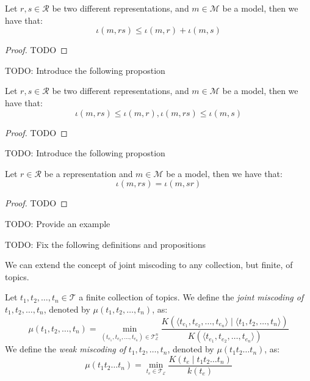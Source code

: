 \begin{proposition}
Let $r, s \in \mathcal{R}$ be two different representations, and $m \in \mathcal{M}$ be a model, then we have that:
\[
\iota(m, rs) \leq \iota(m, r) + \iota(m, s)
\]
\end{proposition}
\begin{proof}
{\color{red} TODO}
\end{proof}

{\color{red} TODO: Introduce the following propostion}

\begin{proposition}
Let $r, s \in \mathcal{R}$ be two different representations, and $m \in \mathcal{M}$ be a model, then we have that:
\[
\iota(m, rs) \leq \iota(m, r), \iota(m, rs) \leq \iota(m, s)
\]
\end{proposition}
\begin{proof}
{\color{red} TODO}
\end{proof}


{\color{red} TODO: Introduce the following propostion}

\begin{proposition}
Let $r \in \mathcal{R}$ be a representation and $m \in \mathcal{M}$ be a model, then we have that:
\[
\iota(m, rs) = \iota(m, sr)
\]
\end{proposition}
\begin{proof}
{\color{red} TODO}
\end{proof}

\begin{example}
\label{ex:inaccuracy_joint_inequality}
{\color{red} TODO: Provide an example}
\end{example}

{\color{red} TODO: Fix the following definitions and propositions}

We can extend the concept of joint miscoding to any collection, but finite, of topics.

\begin{definition}
Let $t_1, t_2, \ldots, t_n \in \mathcal{T}$ a finite collection of topics. We define the \emph{joint miscoding of} $t_1, t_2, \ldots, t_n$, denoted by $\mu(t_1, t_2, \ldots, t_n)$, as:
\[
\mu(t_1, t_2, \ldots, t_n) = \min_{(t_{e_1}, t_{e_2}, \ldots, t_{e_n}) \in \mathcal{T}_\mathcal{E}^n}  \frac{K \left( \langle t_{e_1}, t_{e_2}, \ldots, t_{e_n} \rangle \mid \langle t_1, t_2, \ldots, t_n \rangle \right) }{K \left( \langle t_{e_1}, t_{e_2}, \ldots, t_{e_n} \rangle \right)}
\]
We define the \emph{weak miscoding of} $t_1, t_2, \ldots, t_n$, denoted by $\mu(t_1 t_2 \ldots t_n)$, as:
\[
\mu(t_1 t_2 \ldots t_n) = \min_{t_e \in \mathcal{T}_\mathcal{E}} \frac{K(t_e \mid t_1 t_2 \ldots t_n)}{k(t_e)}
\]
\end{definition}

